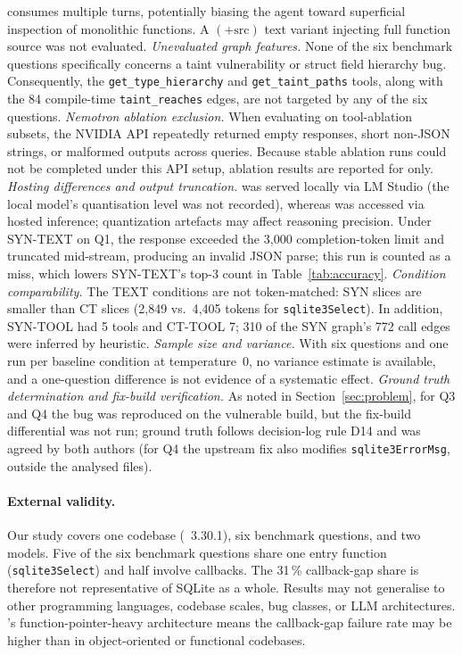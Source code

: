 consumes multiple turns, potentially biasing the agent toward superficial inspection of monolithic functions.
A $(+\text{src})$ text variant injecting full function source was not evaluated.
\emph{Unevaluated graph features.}
None of the six benchmark questions specifically concerns a taint vulnerability or struct field hierarchy bug.
Consequently, the \texttt{get\_type\_hierarchy} and \texttt{get\_taint\_paths} tools, along with the
84 compile-time \texttt{taint\_reaches} edges, are not targeted by any of the six questions.
\emph{Nemotron ablation exclusion.}
When evaluating \nemotron{} on tool-ablation subsets, the NVIDIA API repeatedly returned
empty responses, short non-JSON strings, or malformed outputs across queries.
Because stable ablation runs could not be completed under this API setup, ablation results
are reported for \qwen{} only.
\emph{Hosting differences and output truncation.}
\qwen was served locally via LM Studio (the local model's quantisation level was not recorded), whereas \nemotron was accessed via hosted inference; quantization artefacts may affect reasoning precision.
Under \nemotron \textsc{SYN-TEXT} on Q1, the response exceeded the 3{,}000 completion-token limit
and truncated mid-stream, producing an invalid JSON parse; this run is counted as a miss,
which lowers \nemotron \textsc{SYN-TEXT}'s top-3 count in Table~\ref{tab:accuracy}.
\emph{Condition comparability.}
The TEXT conditions are not token-matched: SYN slices are smaller than CT slices (2{,}849 vs.\ 4{,}405 tokens for \texttt{sqlite3Select}).
In addition, \textsc{SYN-TOOL} had 5 tools and \textsc{CT-TOOL} 7; 310 of the SYN graph's 772 call edges were inferred by heuristic.
\emph{Sample size and variance.}
With six questions and one run per baseline condition at temperature~0, no variance estimate is available, and a one-question difference is not evidence of a systematic effect.
\emph{Ground truth determination and fix-build verification.}
As noted in Section~\ref{sec:problem}, for Q3 and Q4 the bug was reproduced on the vulnerable build,
but the fix-build differential was not run; ground truth follows decision-log rule D14 and was agreed
by both authors (for Q4 the upstream fix also modifies \texttt{sqlite3ErrorMsg}, outside the analysed files).

\paragraph{External validity.}
Our study covers one codebase (\sqlite~3.30.1), six benchmark questions, and
two models.
Five of the six benchmark questions share one entry function (\texttt{sqlite3Select}) and half involve callbacks.
The 31\,\% callback-gap share is therefore not representative of SQLite as a whole.
Results may not generalise to other programming languages, codebase scales, bug classes,
or LLM architectures.
\sqlite's function-pointer-heavy architecture means the callback-gap failure
rate may be higher than in object-oriented or functional codebases.

